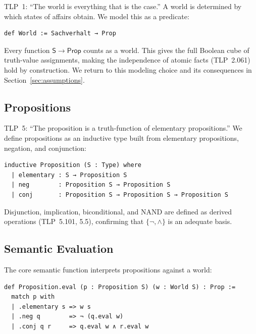 \documentclass[jsl,bibother]{asl}
\theoremstyle{definition}
\theoremstyle{remark}
\newcommand{\Sach}{\mathsf{S}}
\newcommand{\Prop}{\mathsf{Prop}}
\begin{document}
TLP~1: ``The world is everything that is the case.''
A world is determined by which states of affairs obtain.  We
model this as a predicate:

\begin{lstlisting}
def World := Sachverhalt → Prop
\end{lstlisting}

\noindent
Every function $\Sach \to \Prop$ counts as a world.  This gives
the full Boolean cube of truth-value assignments, making the
independence of atomic facts (TLP~2.061) hold by construction.
We return to this modeling choice and its consequences in
Section~\ref{sec:assumptions}.

\subsection{Propositions}
\label{sec:propositions}

TLP~5: ``The proposition is a truth-function of elementary
propositions.''  We define propositions as an inductive type
built from elementary propositions, negation, and conjunction:

\begin{lstlisting}
inductive Proposition (S : Type) where
  | elementary : S → Proposition S
  | neg        : Proposition S → Proposition S
  | conj       : Proposition S → Proposition S → Proposition S
\end{lstlisting}

\noindent
Disjunction, implication, biconditional, and NAND are defined as
derived operations (TLP~5.101, 5.5), confirming that $\{\lnot, \land\}$
is an adequate basis.

\subsection{Semantic Evaluation}
\label{sec:eval}

The core semantic function interprets propositions against a
world:

\begin{lstlisting}
def Proposition.eval (p : Proposition S) (w : World S) : Prop :=
  match p with
  | .elementary s => w s
  | .neg q        => ¬ (q.eval w)
  | .conj q r     => q.eval w ∧ r.eval w
\end{lstlisting}
\end{document}
